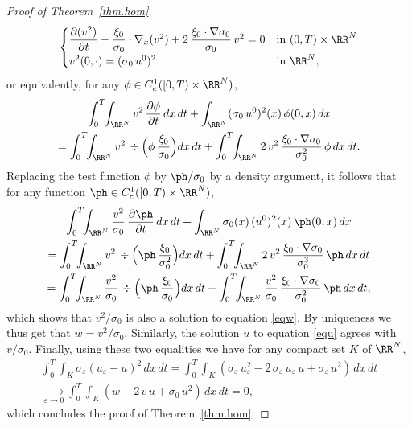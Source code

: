 \begin{proof}[Proof of Theorem~\ref{thm.hom}]
\[
\begin{cases}
\dfrac{\partial(v^2)}{\partial t}-\dfrac{\xi_0}{\sigma_0}\cdot\nabla_x(v^2)+2\, \dfrac{\xi_0\cdot\nabla\sigma_0}{\sigma_0}\,v^2=0 & \mbox{in }(0,T)\times\RR^N
\\[5pt]
v^2(0,\cdot)=(\sigma_0\, u^0)^2 & \mbox{in }\RR^N,
\end{cases}
\]
or equivalently, for any $\phi\in C^1_c([0,T)\times\RR^N)$,
\begin{multline*}
 \int_0^T\!\!\int_{\RR^N}v^2\, \dfrac{\partial\phi}{\partial t}\,dx\,dt+\int_{\RR^N}(\sigma_0\, u^0)^2(x)\,\phi(0,x)\,dx
\\
=\int_0^T\!\!\int_{\RR^N}v^2\,\div\Bigl(\phi\, \dfrac{\xi_0}{\sigma_0}\Bigr)dx\,dt+\int_0^T\!\!\int_{\RR^N}2\,v^2\, \dfrac{\xi_0\cdot\nabla\sigma_0}{\sigma_0^2}\,\phi\,dx\,dt.
\end{multline*}
Replacing the test function $\phi$ by $\ph/\sigma_0$ by a density argument, it follows that for any function $\ph\in C^1_c([0,T)\times\RR^N)$,
\begin{multline*}
 \int_0^T\!\!\int_{\RR^N} \dfrac{v^2}{\sigma_0}\, \dfrac{\partial\ph}{\partial t}\,dx\,dt+\int_{\RR^N}\sigma_0(x)\,(u^0)^2(x)\,\ph(0,x)\,dx
\\
=\int_0^T\!\!\int_{\RR^N}v^2\,\div\Bigl(\ph\, \dfrac{\xi_0}{\sigma_0^2}\Bigr)dx\,dt+\int_0^T\!\!\int_{\RR^N}2\,v^2\, \dfrac{\xi_0\cdot\nabla\sigma_0}{\sigma_0^3}\,\ph\,dx\,dt
\\
=\int_0^T\!\!\int_{\RR^N} \dfrac{v^2}{\sigma_0}\,\div\Bigl(\ph\, \dfrac{\xi_0}{\sigma_0}\Bigr)dx\,dt+\int_0^T\!\!\int_{\RR^N} \dfrac{v^2}{\sigma_0}\, \dfrac{\xi_0\cdot\nabla\sigma_0}{\sigma_0^2}\,\ph\,dx\,dt,
\end{multline*}
which shows that $v^2/\sigma_0$ is also a solution to equation \eqref{eqw}. By uniqueness we thus get that $w=v^2/\sigma_0$.
Similarly, the solution $u$ to equation \eqref{equ} agrees with $v/\sigma_0$.
Finally, using these two equalities we have for any compact set $K$ of $\RR^N$,
\begin{multline*}
 \int_0^T\!\!\int_{K}\sigma_\varepsilon(u_\varepsilon-u)^2\,dx\,dt=\int_0^T\!\!\int_{K}(\sigma_\varepsilon\,u_\varepsilon^2-2\,\sigma_\varepsilon\,u_\varepsilon\,u+\sigma_\varepsilon\,u^2)\,dx\,dt
\\[-8pt]
\xrightarrow[\varepsilon\to 0]\;\int_0^T\!\!\int_{K}(w-2\,v\,u+\sigma_0\,u^2)\,dx\,dt=0,
\end{multline*}
which concludes the proof of Theorem~\ref{thm.hom}.
\end{proof}

